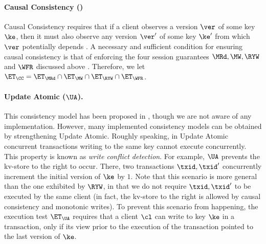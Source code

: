 \paragraph{Causal Consistency (\CC)}
Causal Consistency requires that if a client observes a version 
$\ver$ of some key $\ke$, then it must also observe any version $\ver'$ of some key $\ke'$ 
from which $\ver$ potentially depends \cite{cops}. A necessary and sufficient condition 
for ensuring causal consistency is that of enforcing the four session guarantees $\MRd, \MW, \RYW$ and $\WFR$ 
discussed above \cite{session2causal}. Therefore, we let $\ET_{\CC} = \ET_{\MRd} \cap \ET_{\MW} 
\cap \ET_{\RYW} \cap \ET_{\WFR}$. 

\paragraph{Update Atomic ($\UA$).}
This consistency model has been proposed in \cite{framework-concur}, though we 
are not aware of any implementation. However, many implemented consistency models 
can be obtained by strengthening Update Atomic. Roughly speaking, in Update Atomic 
concurrent transactions writing to the same key cannot execute concurrently. This property 
is known as \emph{write conflict detection}. For example, $\UA$ prevents the kv-store to 
the right to occur. There, two transactions $\txid, \txid'$ concurrently increment the initial 
version of $\ke$ by $1$. Note that this scenario is more general than the one exhibited by 
$\RYW$, in that we do not require $\txid, \txid'$ to be executed by the same client 
(in fact, the kv-store to the right is allowed by causal consistency and monotonic writes).
To prevent this scenario from happening, the execution test $\ET_{\UA}$ requires 
that a client $\cl$ can write to key $\ke$ in a transaction, only if its view prior 
to the execution of the transaction pointed to the last version of $\ke$.

